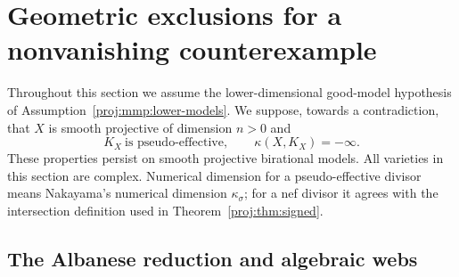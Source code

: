 \documentclass[11pt,letterpaper]{article}
\theoremstyle{definition}
\theoremstyle{remark}
\begin{document}
\section{Geometric exclusions for a nonvanishing counterexample}
\label{proj:sec:exclusions}

Throughout this section we assume the lower-dimensional good-model
hypothesis of Assumption~\ref{proj:mmp:lower-models}. We suppose, towards a
contradiction, that \(X\) is smooth projective of dimension \(n>0\) and
\begin{equation}\label{proj:ex:counterexample}
 K_X\ \text{is pseudo-effective},
 \qquad \kappa(X,K_X)=-\infty.
\end{equation}
These properties persist on smooth projective birational models. All
varieties in this section are complex. Numerical dimension for a
pseudo-effective divisor means Nakayama's numerical dimension
\(\kappa_\sigma\); for a nef divisor it agrees with the intersection
definition used in Theorem~\ref{proj:thm:signed}.

\subsection{The Albanese reduction and algebraic webs}
\end{document}
